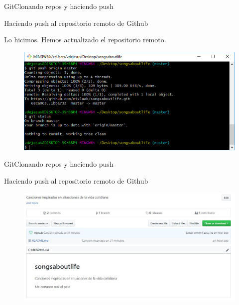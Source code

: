 \documentclass[10pt]{beamer}
\begin{document}
\begin{frame}{Git}{Clonando repos y haciendo push}

\begin{block}{Haciendo push al repositorio remoto de Github}

Lo hicimos. Hemos actualizado el repositorio remoto.

\medskip

\begin{figure}[h!]
\centering
\includegraphics [scale=0.55]{eureka}
\label{fig:gitlog}
\end{figure}

\end{block}

\end{frame}

\begin{frame}{Git}{Clonando repos y haciendo push}

\begin{block}{Haciendo push al repositorio remoto de Github}


\medskip

\begin{figure}[h!]
\centering
\includegraphics [scale=0.36]{eureka2}
\label{fig:gitlog}
\end{figure}

\end{block}

\end{frame}
\end{document}
